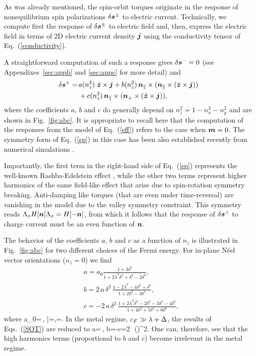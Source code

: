 As was already mentioned, the spin-orbit torques originate in the response of nonequilibrium spin polarizations $\delta\boldsymbol{s}^\pm$ to electric current. Technically, we compute first the response of $\delta\boldsymbol{s}^\pm$ to electric field and, then, express the electric field in terms of 2D electric current density $\boldsymbol{j}$ using the conductivity tensor of Eq.~(\ref{conductivity}).

A straightforward computation of such a response gives $\delta\boldsymbol{s}^-=0$ (see Appendixes~\ref{sec:appb} and \ref{sec:appc} for more detail) and 
\begin{align}
\label{sp}
\delta\boldsymbol{s}^+= \,&a(n_z^2)\;\hat{\boldsymbol{z}}\times \boldsymbol{j} + b(n_z^2)\, \boldsymbol{n}_\parallel\times(\boldsymbol{n}_\parallel\times \left(\hat{\boldsymbol{z}}\times \boldsymbol{j}\right)) \nonumber\\
&+ c(n_z^2)\, \boldsymbol{n}_\parallel \times(\boldsymbol{n}_\perp\times \left(\hat{\boldsymbol{z}}\times \boldsymbol{j}\right)),
\end{align}
where the coefficients $a$, $b$ and $c$ do generally depend on $n_z^2=1-n_x^2-n_y^2$ and are shown in Fig.~\ref{fig:abc}. 
It is appropriate to recall here that the computation of the responses from the model of Eq.~(\ref{eff}) refers to the case when $\boldsymbol{m}=0$. The symmetry form of Eq.~(\ref{sp}) in this case has been also established recently from numerical simulations \cite{Sumit2019}.

Importantly, the first term in the right-hand side of Eq.~(\ref{sp}) represents the well-known Rashba-Edelstein effect \cite{Edelstein1990}, while the other two terms represent higher harmonics of the same field-like effect that arise due to spin-rotation symmetry breaking. Anti-damping like torques (that are even under time-reversal) are vanishing in the model due to the valley symmetry constraint. This symmetry reads $\Lambda_x H[\boldsymbol{n}] \Lambda_x = H[-\boldsymbol{n}]$, from which it follows that the response of $\delta\boldsymbol{s}^+$ to charge current must be an even function of $\boldsymbol{n}$. 

The behavior of the coefficients $a$, $b$ and $c$ as a function of $n_z$ is illustrated in Fig.~\ref{fig:abc} for two different choices of the Fermi energy. For in-plane N\'eel vector orientations ($n_z=0$) we find 
\beml
\label{SOT}
\begin{align}
&a=a_0 \frac{1+3\delta^2}{1+2\bar{\lambda}^2\delta^2+\delta^4-2\delta^6},\\
&b=2\, a\,\delta^2\,\frac{1-2\bar{\lambda}^2-4\delta^2+\delta^4}{1+2\delta^2-3\delta^4},\\
&c=-2\, a\,\delta^2\,\frac{1+2\bar{\lambda}^2\delta^2-2\delta^2-3\delta^4-4\delta^6}{1+4\delta^2+5\delta^4+6\delta^6},
\end{align}
\eml
where
\be
a_0=\,, \qquad \bar{\lambda}=,\qquad\delta=.
\e
In the metal regime, $\varepsilon_F\gg \lambda+\Delta$, the results of Eqs.~(\ref{SOT}) are reduced to 
\be
\label{SOTlargeE}
a=\,, \qquad b=-c=2\,\,
\lt(\rt)^2.
\e
One can, therefore, see that the high harmonics terms (proportional to $b$ and $c$) become irrelevant in the metal regime.  

